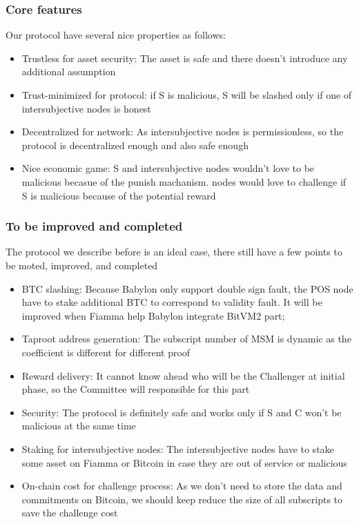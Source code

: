 \subsubsection{Core features}

Our protocol have several nice properties as follows:

\begin{itemize}
    \item Trustless for asset security: The asset is safe and there doesn't introduce any additional assumption
    \item Trust-minimized for protocol: if S is malicious, S will be slashed only if one of intersubjective nodes is honest
    \item Decentralized for network: As intersubjective nodes is permissionless, so the protocol is decentralized enough and also safe enough
    \item Nice economic game: S and intersubjective nodes wouldn't love to be malicious becasue of the punish machanism. nodes would love to challenge if S is malicious because of the potential reward
\end{itemize}

\subsubsection{To be improved and completed}

The protocol we describe before is an ideal case, there still have a few points to be moted, improved, and completed

\begin{itemize}
    \item BTC slashing: Because Babylon only support double sign fault, the POS node have to stake additional BTC to correspond to validity fault. It will be improved when Fiamma help Babylon integrate BitVM2 part;
    \item Taproot address generation: The subscript number of MSM is dynamic as the coefficient is different for different proof 
    \item Reward delivery: It cannot know ahead who will be the Challenger at initial phase, so the Committee will responsible for this part
    \item Security: The protocol is definitely safe and works only if S and C won't be malicious at the same time
    \item Staking for intersubjective nodes: The intersubjective nodes have to stake some asset on Fiamma or Bitcoin in case they are out of service or malicious
    \item On-chain cost for challenge process: As we don't need to store the data and commitments on Bitcoin, we should keep reduce the size of all subscripts to save the challenge cost 
\end{itemize}
